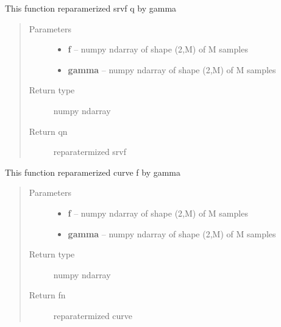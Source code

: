 \documentclass[letterpaper,10pt,english]{sphinxmanual}
\begin{document}

\begin{fulllineitems}
\label{curve_functions:curve_functions.group_action_by_gamma}
This function reparamerized srvf q by gamma
\begin{quote}\begin{description}
\item[{Parameters}] \leavevmode\begin{itemize}
\item {} 
\textbf{f} -- numpy ndarray of shape (2,M) of M samples

\item {} 
\textbf{gamma} -- numpy ndarray of shape (2,M) of M samples

\end{itemize}

\item[{Return type}] \leavevmode
numpy ndarray

\item[{Return qn}] \leavevmode
reparatermized srvf

\end{description}\end{quote}

\end{fulllineitems}


\begin{fulllineitems}
\label{curve_functions:curve_functions.group_action_by_gamma_coord}
This function reparamerized curve f by gamma
\begin{quote}\begin{description}
\item[{Parameters}] \leavevmode\begin{itemize}
\item {} 
\textbf{f} -- numpy ndarray of shape (2,M) of M samples

\item {} 
\textbf{gamma} -- numpy ndarray of shape (2,M) of M samples

\end{itemize}

\item[{Return type}] \leavevmode
numpy ndarray

\item[{Return fn}] \leavevmode
reparatermized curve

\end{description}\end{quote}

\end{fulllineitems}
\end{document}
